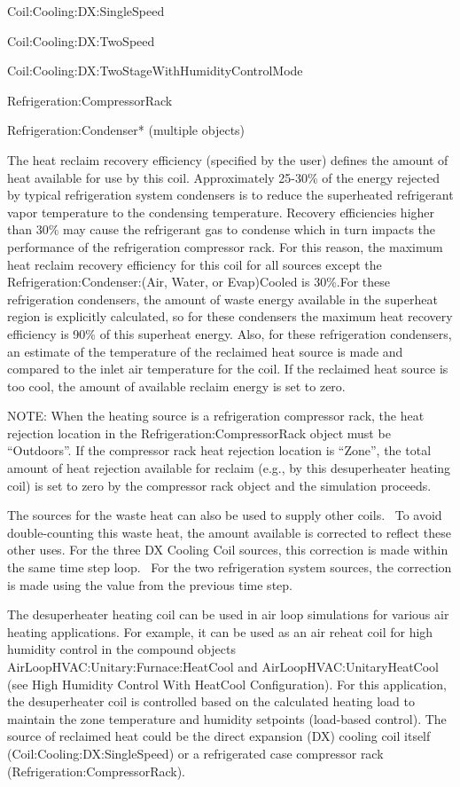 Coil:Cooling:DX:SingleSpeed

Coil:Cooling:DX:TwoSpeed

Coil:Cooling:DX:TwoStageWithHumidityControlMode

Refrigeration:CompressorRack

Refrigeration:Condenser* (multiple objects)

The heat reclaim recovery efficiency (specified by the user) defines the amount of heat available for use by this coil. Approximately 25-30\% of the energy rejected by typical refrigeration system condensers is to reduce the superheated refrigerant vapor temperature to the condensing temperature. Recovery efficiencies higher than 30\% may cause the refrigerant gas to condense which in turn impacts the performance of the refrigeration compressor rack. For this reason, the maximum heat reclaim recovery efficiency for this coil for all sources except the Refrigeration:Condenser:(Air, Water, or Evap)Cooled is 30\%.For these refrigeration condensers, the amount of waste energy available in the superheat region is explicitly calculated, so for these condensers the maximum heat recovery efficiency is 90\% of this superheat energy. Also, for these refrigeration condensers, an estimate of the temperature of the reclaimed heat source is made and compared to the inlet air temperature for the coil. If the reclaimed heat source is too cool, the amount of available reclaim energy is set to zero.

NOTE: When the heating source is a refrigeration compressor rack, the heat rejection location in the Refrigeration:CompressorRack object must be ``Outdoors''. If the compressor rack heat rejection location is ``Zone'', the total amount of heat rejection available for reclaim (e.g., by this desuperheater heating coil) is set to zero by the compressor rack object and the simulation proceeds.

The sources for the waste heat can also be used to supply other coils.~ To avoid double-counting this waste heat, the amount available is corrected to reflect these other uses. For the three DX Cooling Coil sources, this correction is made within the same time step loop.~ For the two refrigeration system sources, the correction is made using the value from the previous time step.

The desuperheater heating coil can be used in air loop simulations for various air heating applications. For example, it can be used as an air reheat coil for high humidity control in the compound objects AirLoopHVAC:Unitary:Furnace:HeatCool and AirLoopHVAC:UnitaryHeatCool (see High Humidity Control With HeatCool Configuration). For this application, the desuperheater coil is controlled based on the calculated heating load to maintain the zone temperature and humidity setpoints (load-based control). The source of reclaimed heat could be the direct expansion (DX) cooling coil itself (Coil:Cooling:DX:SingleSpeed) or a refrigerated case compressor rack (Refrigeration:CompressorRack).

